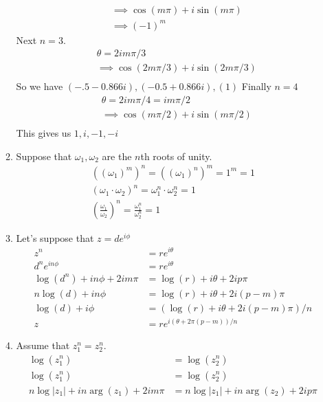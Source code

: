 \documentclass{article}
\begin{document}
\begin{enumerate}
\begin{enumerate}[label=(\roman*)]
\begin{align*}
            &\implies \cos(m\pi)+i\sin(m\pi)\\
            &\implies (-1)^{m}
          \end{align*}
          Next $n=3$.
          \begin{align*}
            &\theta=2im\pi/3\\
            &\implies \cos(2m\pi/3)+i\sin(2m\pi/3)\\
          \end{align*}
          So we have $(-.5-0.866i), (-0.5+0.866i), (1)$
          Finally $n=4$
          \begin{align*}
            &\theta=2im\pi/4=im\pi/2\\
            &\implies \cos(m\pi/2)+i\sin(m\pi/2)\\
          \end{align*}
          This gives us $1,i,-1,-i$
        \item
          Suppose that $\omega_1,\omega_2$ are the $n$th roots of unity.
          \begin{align*}
            ((\omega_1)^m)^n=((\omega_1)^n)^m=1^m=1\\
            (\omega_1\cdot\omega_2)^n=\omega_1^n\cdot\omega_2^n=1\\
            \left(\frac{\omega_1}{\omega_2}\right)^n=\frac{\omega_1^n}{\omega_2^n}=1
          \end{align*}
        \item
          Let's suppose that $z=de^{i\phi}$
          \begin{align*}
            z^n&=re^{i\theta}\\
            d^ne^{in\phi}&=re^{i\theta}\\
            \log(d^n)+in\phi+2im\pi&=\log(r)+i\theta+2ip\pi\\
            n\log(d)+in\phi&=\log(r)+i\theta+2i(p-m)\pi\\
            \log(d)+i\phi&=(\log(r)+i\theta+2i(p-m)\pi)/n\\
            z&=re^{i(\theta+2\pi(p-m))/n}
          \end{align*}
        \item
          Assume that $z_1^n=z_2^n$.
          \begin{align*}
            \log(z_1^n)&=\log(z_2^n)\\
            \log(z_1^n)&=\log(z_2^n)\\
            n\log|z_1|+in\arg(z_1)+2im\pi&=n\log|z_1|+in\arg(z_2)+2ip\pi\\

\end{align*}
\end{enumerate}
\end{enumerate}
\end{document}
